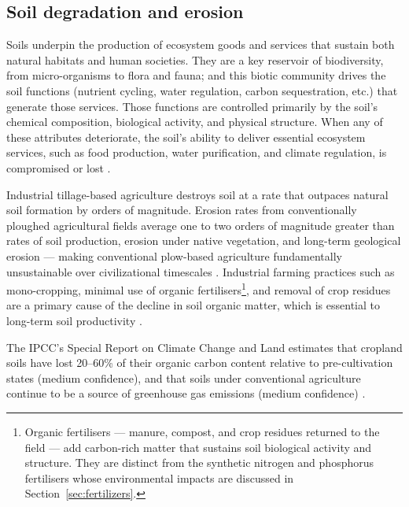 \subsection{Soil degradation and erosion}
Soils underpin the production of ecosystem goods and services that sustain both natural habitats and human societies. They are a key reservoir of biodiversity, from micro-organisms to flora and fauna; and this biotic community drives the soil functions (nutrient cycling, water regulation, carbon sequestration, etc.) that generate those services. Those functions are controlled primarily by the soil's chemical composition, biological activity, and physical structure. When any of these attributes deteriorate, the soil's ability to deliver essential ecosystem services, such as food production, water purification, and climate regulation, is compromised or lost \cite[4-5]{soilCharter}.

Industrial tillage-based agriculture destroys soil at a rate that outpaces natural soil formation by orders of magnitude. Erosion rates from conventionally ploughed agricultural fields average one to two orders of magnitude greater than rates of soil production, erosion under native vegetation, and long-term geological erosion --- making conventional plow-based agriculture fundamentally unsustainable over civilizational timescales \cite{montgomery2007soil}. Industrial farming practices such as mono-cropping, minimal use of organic fertilisers\footnote{Organic fertilisers --- manure, compost, and crop residues returned to the field --- add carbon-rich matter that sustains soil biological activity and structure. They are distinct from the synthetic nitrogen and phosphorus fertilisers whose environmental impacts are discussed in Section~\ref{sec:fertilizers}.}, and removal of crop residues are a primary cause of the decline in soil organic matter, which is essential to long-term soil productivity \cite[Table~7]{lal2004soilcarbon}.

The IPCC's Special Report on Climate Change and Land estimates that cropland soils have lost 20--60\% of their organic carbon content relative to pre-cultivation states (medium confidence), and that soils under conventional agriculture continue to be a source of greenhouse gas emissions (medium confidence) \cite[TS.4]{ipcc2019srccl}.

